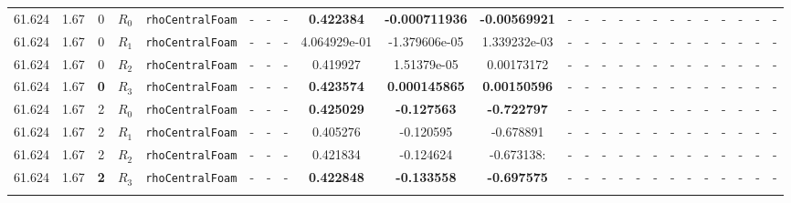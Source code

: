 \documentclass[12pt]{article}
\begin{document}
\begin{table}[H]
{\begin{tabular}{ccccc|ccc|ccc|ccc|ccc|ccccccc}
        \rowcolor{green!10}
        61.624 & 1.67 & 0 & $R_0$ & \texttt{rhoCentralFoam} & - & - & - & \textbf{0.422384} & \textbf{-0.000711936} & \textbf{-0.00569921} & - & - & - & - & - & - & - & - & - & - & - & - & - \\ 
        \rowcolor{green!20}
        61.624 & 1.67 & 0 & $R_1$ & \texttt{rhoCentralFoam} & - & - & - & 4.064929e-01 & -1.379606e-05 & 1.339232e-03 & - & - & - & - & - & - & - & - & - & - & - & - & - \\
        \rowcolor{green!30}
        61.624 & 1.67 & 0 & $R_2$ & \texttt{rhoCentralFoam} & - & - & - & 0.419927 & 1.51379e-05 & 0.00173172 & - & - & - & - & - & - & - & - & - & - & - & - & - \\
        \rowcolor{green!40}
        61.624 & 1.67 & \cellcolor{lime}\textbf{0} & \cellcolor{cyan}$R_3$ & \texttt{rhoCentralFoam} & - & - & - & \textbf{0.423574} & \textbf{0.000145865} & \textbf{0.00150596} & - & - & - & - & - & - & - & - & - & - & - & - & - \\
        \rowcolor{green!10}
        61.624 & 1.67 & 2 & $R_0$ & \texttt{rhoCentralFoam} & - & - & - & \textbf{0.425029} & \textbf{-0.127563} & \textbf{-0.722797} & - & - & - & - & - & - & - & - & - & - & - & - & - \\
        \rowcolor{green!20}
        61.624 & 1.67 & 2 & $R_1$ & \texttt{rhoCentralFoam} & - & - & - & 0.405276 & -0.120595 & -0.678891 & - & - & - & - & - & - & - & - & - & - & - & - & - \\
        \rowcolor{green!30}
        61.624 & 1.67 & 2 & $R_2$ & \texttt{rhoCentralFoam} & - & - & - & 0.421834 & -0.124624 & -0.673138: & - & - & - & - & - & - & - & - & - & - & - & - & - \\
        \rowcolor{green!20} %
        61.624 & 1.67 & \cellcolor{lime}\textbf{2} & \cellcolor{cyan}$R_3$ & \texttt{rhoCentralFoam} & - & - & - & \textbf{0.422848} & \textbf{-0.133558} & \textbf{-0.697575} & - & - & - & - & - & - & - & - & - & - & - & - & - \\
        \rowcolor{green!10}

\end{tabular}}
\end{table}
\end{document}

